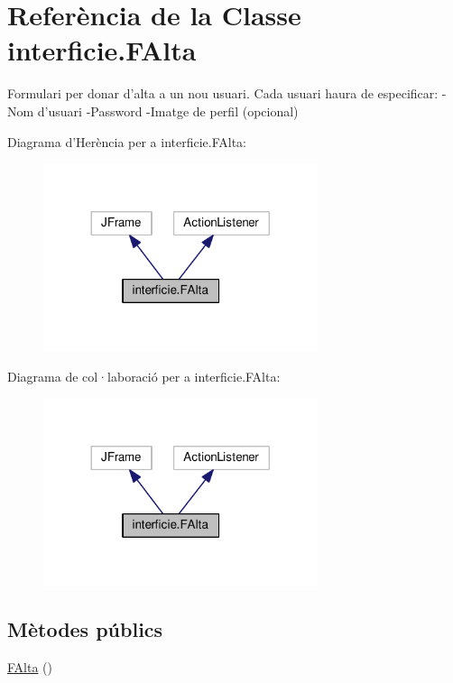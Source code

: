 \hypertarget{classinterficie_1_1_f_alta}{\section{Referència de la Classe interficie.\+F\+Alta}
\label{classinterficie_1_1_f_alta}
}


Formulari per donar d'alta a un nou usuari. Cada usuari haura de especificar\+: -\/\+Nom d'usuari -\/\+Password -\/\+Imatge de perfil (opcional)  




Diagrama d'Herència per a interficie.\+F\+Alta\+:\nopagebreak
\begin{figure}[H]
\begin{center}
\leavevmode
\includegraphics[width=228pt]{classinterficie_1_1_f_alta__inherit__graph}
\end{center}
\end{figure}


Diagrama de col·laboració per a interficie.\+F\+Alta\+:\nopagebreak
\begin{figure}[H]
\begin{center}
\leavevmode
\includegraphics[width=228pt]{classinterficie_1_1_f_alta__coll__graph}
\end{center}
\end{figure}
\subsection*{Mètodes públics}
\begin{DoxyCompactItemize}
\item 
\hyperlink{classinterficie_1_1_f_alta_ad9049ce9f00f165a714f7d343227cb97}{F\+Alta} ()
\end{DoxyCompactItemize}



